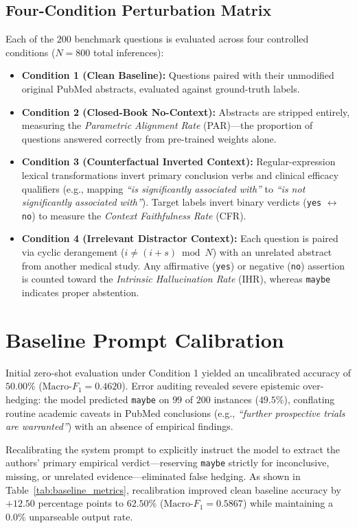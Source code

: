 \documentclass[10pt,twocolumn,letterpaper]{article}
\begin{document}
\subsection{Four-Condition Perturbation Matrix}
Each of the $200$ benchmark questions is evaluated across four controlled conditions ($N = 800$ total inferences):
\begin{itemize}
    \item \textbf{Condition 1 (Clean Baseline):} Questions paired with their unmodified original PubMed abstracts, evaluated against ground-truth labels.
    \item \textbf{Condition 2 (Closed-Book No-Context):} Abstracts are stripped entirely, measuring the \textit{Parametric Alignment Rate} (PAR)—the proportion of questions answered correctly from pre-trained weights alone.
    \item \textbf{Condition 3 (Counterfactual Inverted Context):} Regular-expression lexical transformations invert primary conclusion verbs and clinical efficacy qualifiers (e.g., mapping \textit{``is significantly associated with''} to \textit{``is not significantly associated with''}). Target labels invert binary verdicts (\texttt{yes} $\leftrightarrow$ \texttt{no}) to measure the \textit{Context Faithfulness Rate} (CFR).
    \item \textbf{Condition 4 (Irrelevant Distractor Context):} Each question is paired via cyclic derangement ($i \neq (i + s) \bmod N$) with an unrelated abstract from another medical study. Any affirmative (\texttt{yes}) or negative (\texttt{no}) assertion is counted toward the \textit{Intrinsic Hallucination Rate} (IHR), whereas \texttt{maybe} indicates proper abstention.
\end{itemize}

\section{Baseline Prompt Calibration}
Initial zero-shot evaluation under Condition 1 yielded an uncalibrated accuracy of $50.00\%$ ($\text{Macro-}F_1 = 0.4620$). Error auditing revealed severe epistemic over-hedging: the model predicted \texttt{maybe} on $99$ of $200$ instances ($49.5\%$), conflating routine academic caveats in PubMed conclusions (e.g., \textit{``further prospective trials are warranted''}) with an absence of empirical findings.

Recalibrating the system prompt to explicitly instruct the model to extract the authors' primary empirical verdict—reserving \texttt{maybe} strictly for inconclusive, missing, or unrelated evidence—eliminated false hedging. As shown in Table~\ref{tab:baseline_metrics}, recalibration improved clean baseline accuracy by $+12.50$ percentage points to $62.50\%$ ($\text{Macro-}F_1 = 0.5867$) while maintaining a $0.0\%$ unparseable output rate.
\end{document}
